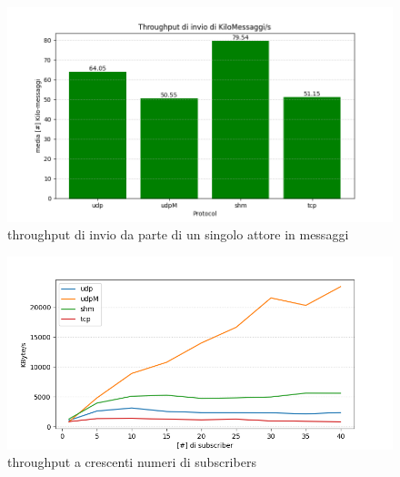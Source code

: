 \begin{figure}[H]
    \includegraphics[width=\textwidth]{./results/test3_throughput_m.png} 
        \caption{throughput di invio da parte di un singolo attore in messaggi} %
        \label{fig:throughput_msg}
\end{figure}


\begin{figure}[H]
    \includegraphics[width=\textwidth]{./results/test3_graph_throughput.png} 
    \caption{throughput a crescenti numeri di subscribers} 
    \label{fig:throughput_increasing}
\end{figure}

